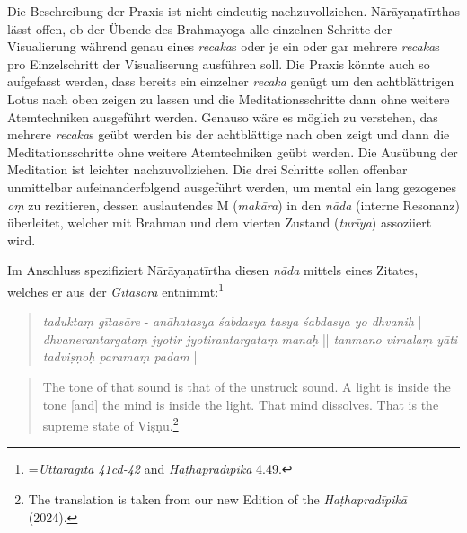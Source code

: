 Die Beschreibung der Praxis ist nicht eindeutig nachzuvollziehen. Nārāyaṇatīrthas lässt offen, ob der Übende des Brahmayoga alle einzelnen Schritte der Visualierung während genau eines \textit{recaka}s oder je ein oder gar mehrere \textit{recaka}s pro Einzelschritt der Visualiserung ausführen soll. Die Praxis könnte auch so aufgefasst werden, dass bereits ein einzelner \textit{recaka} genügt um den achtblättrigen Lotus nach oben zeigen zu lassen und die Meditationsschritte dann ohne weitere Atemtechniken ausgeführt werden. Genauso wäre es möglich zu verstehen, das mehrere \textit{recaka}s geübt werden bis der achtblättige nach oben zeigt und dann die Meditationsschritte ohne weitere Atemtechniken geübt werden.
Die Ausübung der Meditation ist leichter nachzuvollziehen. Die drei Schritte sollen offenbar unmittelbar aufeinanderfolgend ausgeführt werden, um mental ein lang gezogenes \textit{oṃ} zu rezitieren, dessen auslautendes M (\textit{makāra}) in den \textit{nāda} (interne Resonanz) überleitet, welcher mit Brahman und dem vierten Zustand (\textit{turīya}) assoziiert wird.

Im Anschluss spezifiziert Nārāyaṇatīrtha diesen \textit{nāda} mittels eines Zitates, welches er aus der \textit{Gītāsāra} entnimmt:\footnote{=\textit{Uttaragīta 41cd-42} and \textit{Haṭhapradīpikā} 4.49.}

\begin{quote}
\textit{taduktaṃ gītasāre} -
\textit{anāhatasya śabdasya tasya śabdasya yo dhvaniḥ} |
\textit{dhvanerantargataṃ jyotir jyotirantargataṃ manaḥ} ||
\textit{tanmano vimalaṃ yāti tadviṣṇoḥ paramaṃ padam} |
\end{quote}
\begin{quote}
The tone of that sound is that of the unstruck sound. A light is inside the tone [and] the mind is inside the light. That mind dissolves. That is the supreme state of Viṣṇu.\footnote{The translation is taken from our new Edition of the \textit{Haṭhapradīpikā} (2024).}
  \end{quote}

